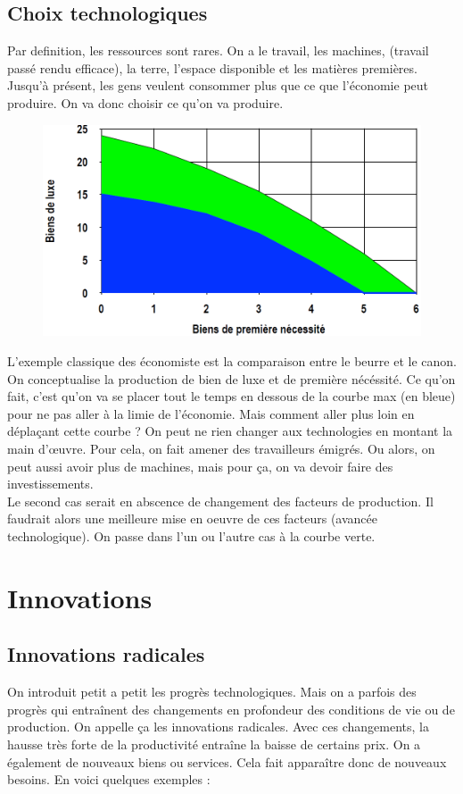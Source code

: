 \subsection{Choix technologiques}
Par definition, les ressources sont rares. On a le travail, les machines, (travail passé rendu efficace), la terre, l'espace disponible et les matières premières. Jusqu'à présent, les gens veulent consommer plus que ce que l'économie peut produire. On va donc choisir ce qu'on va produire. 

\begin{figure}
\includegraphics[scale=0.3]{59}
\end{figure}
L'exemple classique des économiste est la comparaison entre le beurre et le canon. On conceptualise la production de bien de luxe et de première nécéssité. Ce qu'on fait, c'est qu'on va se placer tout le temps en dessous de la courbe max (en bleue) pour ne pas aller à la limie de l'économie. Mais comment aller plus loin en déplaçant cette courbe ? On peut ne rien changer aux technologies en montant la main d'œuvre. Pour cela, on fait amener des travailleurs émigrés. Ou alors, on peut aussi avoir plus de machines, mais pour ça, on va devoir faire des investissements. \\
Le second cas serait en abscence de changement des facteurs de production. Il faudrait alors une meilleure mise en oeuvre de ces facteurs (avancée technologique). On passe dans l'un ou l'autre cas à la courbe verte. 

\section{Innovations}
\subsection{Innovations radicales}
On introduit petit a petit les progrès technologiques. Mais on a parfois des progrès qui entraînent des changements en profondeur des conditions de vie ou de production. On appelle ça les innovations radicales. Avec ces changements, la hausse très forte de la productivité entraîne la baisse de certains prix. On a également de nouveaux biens ou services. Cela fait apparaître donc de nouveaux besoins. En voici quelques exemples : 

